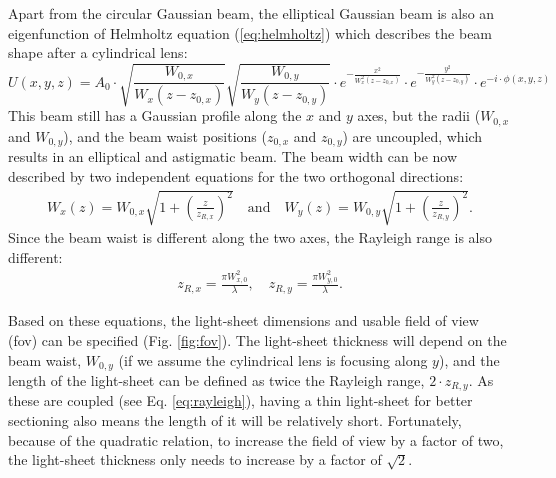     Apart from the circular Gaussian beam, the elliptical Gaussian beam is also an eigenfunction of Helmholtz equation (\ref{eq:helmholtz}) which describes the beam shape after a cylindrical lens:
    \begin{equation}
      U(x,y,z) = A_0 \cdot \sqrt{\frac{W_{0,x}}{W_x(z-z_{0,x})}} \sqrt{\frac{W_{0,y}}{W_y(z-z_{0,y})}} \cdot e^{-\frac{x^2}{W_x^2(z-z_{0,x})}} \cdot e^{-\frac{y^2}{W_y^2(z-z_{0,y})}} \cdot e^{-i\cdot \phi(x,y,z)}
    \end{equation}
    This beam still has a Gaussian profile along the $x$ and $y$ axes, but the radii ($W_{0,x}$ and $W_{0,y}$), and the beam waist positions ($z_{0,x}$ and $z_{0,y}$) are uncoupled, which results in an elliptical and astigmatic beam. The beam width can be now described by two independent equations for the two orthogonal directions:
    \begin{align}
      W_x(z) = W_{0,x}\sqrt{1+\left( \frac{z}{z_{R,x}} \right)^2}\mathrm{\quad and \quad } W_y(z) = W_{0,y}\sqrt{1+\left( \frac{z}{z_{R,y}} \right)^2}.
    \end{align}
    Since the beam waist is different along the two axes, the Rayleigh range is also different:
    \begin{align}
      z_{R,x} = \frac{\pi W_{x,0}^2}{\lambda}, \quad
      z_{R,y} = \frac{\pi W_{y,0}^2}{\lambda}.
      \label{eq:rayleigh}
    \end{align}
    
    
    Based on these equations, the light-sheet dimensions and usable field of view (fov) can be specified (Fig. \ref{fig:fov}). The light-sheet thickness will depend on the beam waist, $W_{0,y}$ (if we assume the cylindrical lens is focusing along $y$), and the length of the light-sheet can be defined as twice the Rayleigh range, $2 \cdot z_{R,y}$. As these are coupled (see Eq. \ref{eq:rayleigh}), having a thin light-sheet for better sectioning also means the length of it will be relatively short. Fortunately, because of the quadratic relation, to increase the field of view by a factor of two, the light-sheet thickness only needs to increase by a factor of $\sqrt{2}$.


